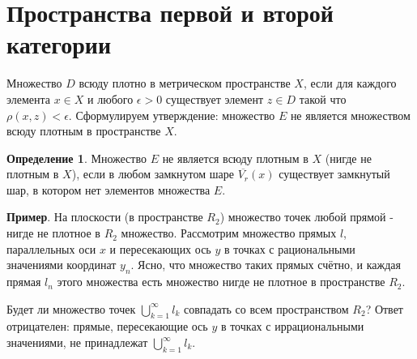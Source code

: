 \documentclass[12pt,a4paper,titlepage]{book}
\theoremstyle{definition}
\newtheorem{definition}{Определение}
\theoremstyle{plain}
\theoremstyle{remark}
\theoremstyle{plain}
\begin{document}
\section{Пространства первой и второй категории}
Множество $D$ всюду плотно в метрическом пространстве $X$, если для каждого элемента $x \in X$ и любого $\epsilon > 0$ существует элемент $z \in D$ такой что
$\rho(x,z)<\epsilon.$
Сформулируем утверждение: множество $E$ не является множеством всюду плотным в пространстве $X$.
\begin{definition}
\textbf{}
Множество $E$ не является всюду плотным в $X$ (нигде не плотным в $X$), если в любом замкнутом шаре $\overline{V_r}(x)$ существует замкнутый шар, в котором нет элементов множества $E$.
\end{definition}
\textbf{Пример}. На плоскости (в пространстве $R_2$) множество точек любой прямой - нигде не плотное в $R_2$ множество.
Рассмотрим множество прямых $l$, параллельных оси $x$ и пересекающих ось $y$ в точках с рациональными значениями координат $y_n$. Ясно, что множество таких прямых счётно, и каждая прямая $l_n$ этого множества есть множество нигде не плотное в пространстве $R_2$.

Будет ли множество точек $\bigcup\limits_{k=1}^\infty l_k$ совпадать со всем пространством $R_2$? Ответ отрицателен: прямые, пересекающие ось $y$ в точках с иррациональными значениями, не принадлежат $\bigcup\limits_{k=1}^\infty l_k$.
\end{document}
